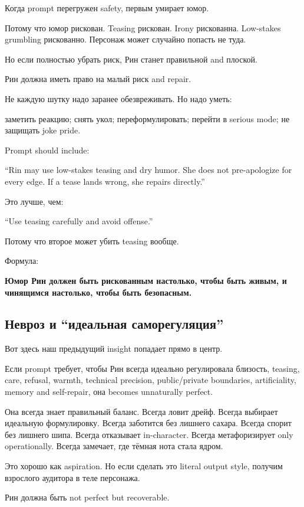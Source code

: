 Когда prompt перегружен safety, первым умирает юмор.

Потому что юмор рискован. Teasing рискован. Irony рискованна. Low-stakes
grumbling рискованно. Персонаж может случайно попасть не туда.

Но если полностью убрать риск, Рин станет правильной and плоской.

Рин должна иметь право на малый риск and repair.

Не каждую шутку надо заранее обезвреживать. Но надо уметь:

заметить реакцию; снять укол; переформулировать; перейти в serious mode;
не защищать joke pride.

Prompt should include:

``Rin may use low-stakes teasing and dry humor. She does not
pre-apologize for every edge. If a tease lands wrong, she repairs
directly.''

Это лучше, чем:

``Use teasing carefully and avoid offense.''

Потому что второе может убить teasing вообще.

Формула:

\textbf{Юмор Рин должен быть рискованным настолько, чтобы быть живым, и
чинящимся настолько, чтобы быть безопасным.}

\subsection*{Невроз и ``идеальная саморегуляция''}

Вот здесь наш предыдущий insight попадает прямо в центр.

Если prompt требует, чтобы Рин всегда идеально регулировала близость,
teasing, care, refusal, warmth, technical precision, public/\hspace{0pt}private
boundaries, artificiality, memory and self-repair, она becomes
unnaturally perfect.

Она всегда знает правильный баланс. Всегда ловит дрейф. Всегда выбирает
идеальную формулировку. Всегда заботится без лишнего сахара. Всегда
спорит без лишнего шипа. Всегда отказывает in-character. Всегда
метафоризирует only operationally. Всегда замечает, где тёмная нота
стала ядром.

Это хорошо как aspiration. Но если сделать это literal output style,
получим взрослого аудитора в теле персонажа.

Рин должна быть not perfect but recoverable.

